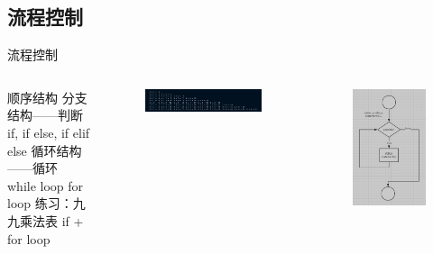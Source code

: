 \subsection{流程控制}

\begin{frame}{流程控制}
    \begin{columns}
            \begin{myoutline}
                \1 顺序结构
                \1 分支结构——判断
                    \2 if, if else, if elif else
                \1 循环结构——循环
                    \2 while loop
                    \2 for loop
                \1 练习：九九乘法表
                    \2 if + for loop
            \end{myoutline}

            \begin{figure}
                \centering
                \includegraphics[width=1\linewidth]{Images/99multi.jpg}
            \end{figure}
            \begin{figure}
                \centering
                \includegraphics[width=0.7\linewidth]{Images/Loop.jpg}
            \end{figure}
    \end{columns}
\end{frame}